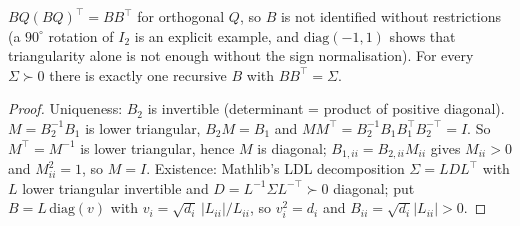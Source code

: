 \begin{theorem}
\label{thm:svar}
\leanok
{}
$BQ(BQ)^\top = BB^\top$ for orthogonal $Q$, so $B$ is not identified without restrictions (a $90^\circ$ rotation of $I_2$
is an explicit example, and $\mathrm{diag}(-1,1)$ shows that triangularity alone is not enough without the sign
normalisation). For every $\Sigma\succ0$ there is exactly one recursive $B$ with $BB^\top = \Sigma$.
\end{theorem}
\begin{proof}
\leanok
Uniqueness: $B_2$ is invertible (determinant = product of positive diagonal). $M = B_2^{-1}B_1$ is lower triangular,
$B_2M = B_1$ and $MM^\top = B_2^{-1}B_1B_1^\top B_2^{-\top} = I$. So $M^\top = M^{-1}$ is lower triangular, hence $M$ is
diagonal; $B_{1,ii} = B_{2,ii}M_{ii}$ gives $M_{ii}>0$ and $M_{ii}^2 = 1$, so $M = I$. Existence: Mathlib's LDL
decomposition $\Sigma = LDL^\top$ with $L$ lower triangular invertible and $D = L^{-1}\Sigma L^{-\top}\succ0$ diagonal;
put $B = L\,\mathrm{diag}(v)$ with $v_i = \sqrt{d_i}\,|L_{ii}|/L_{ii}$, so $v_i^2 = d_i$ and $B_{ii} = \sqrt{d_i}|L_{ii}|>0$.
\end{proof}
